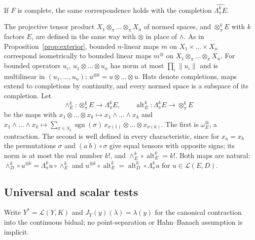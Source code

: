 \documentclass[11pt]{amsart}
\theoremstyle{definition}
\theoremstyle{remark}
\numberwithin{equation}{section}
\newcommand{\cL}{\mathcal L}
\newcommand{\sgn}{\operatorname{sgn}}
\newcommand{\norm}[1]{\lVert #1\rVert}
\theoremstyle{plain}
\theoremstyle{definition}
\theoremstyle{plain}
\begin{document}
If $F$ is complete, the same correspondence holds with the completion $\widehat{\Lambda^k_\pi E}$.

The projective tensor product $X_1\otimes_\pi\dots\otimes_\pi X_n$ of normed spaces, and $\otimes^k_\pi E$ with $k$
factors $E$, are defined in the same way with $\otimes$ in place of $\wedge$. As in Proposition~\ref{prop:exterior},
bounded $n$-linear maps $m$ on $X_1\times\dots\times X_n$ correspond isometrically to bounded linear maps $m^\otimes$ on
$X_1\otimes_\pi\dots\otimes_\pi X_n$. For bounded operators $u_i$, $u_1\otimes\dots\otimes u_n$ has norm at most
$\prod_i\norm{u_i}$ and is multilinear in $(u_1,\dots,u_n)$; $u^{\otimes k}=u\otimes\dots\otimes u$. Hats denote
completions, maps extend to completions by continuity, and every normed space is a subspace of its completion. Let
\[
 \wedge^k_E\colon\otimes^k_\pi E\to\Lambda^k_\pi E,\qquad
 \operatorname{alt}^k_E\colon\Lambda^k_\pi E\to\otimes^k_\pi E
\]
be the maps with $x_1\otimes\dots\otimes x_k\mapsto x_1\wedge\dots\wedge x_k$ and
$x_1\wedge\dots\wedge x_k\mapsto\sum_{\sigma\in S_k}\sgn(\sigma)\,x_{\sigma(1)}\otimes\dots\otimes x_{\sigma(k)}$. The first is
$\omega_E^\otimes$, a contraction. The second is well defined in every characteristic, since for $x_a=x_b$ the
permutations $\sigma$ and $(a\ b)\circ\sigma$ give equal tensors with opposite signs; its norm is at most the real number
$k!$, and $\wedge^k_E\circ\operatorname{alt}^k_E=k!$. Both maps are natural:
$\wedge^k_D\circ u^{\otimes k}=\Lambda^k_\pi u\circ\wedge^k_E$ and
$u^{\otimes k}\circ\operatorname{alt}^k_E=\operatorname{alt}^k_D\circ\Lambda^k_\pi u$ for $u\in\cL(E,D)$.

\subsection{Universal and scalar tests}\label{ob:ssec:tests}

Write $Y^*=\cL(Y,K)$ and $J_Y(y)(\lambda)=\lambda(y)$ for the canonical contraction into the continuous bidual; no
point-separation or Hahn--Banach assumption is implicit.
\end{document}
